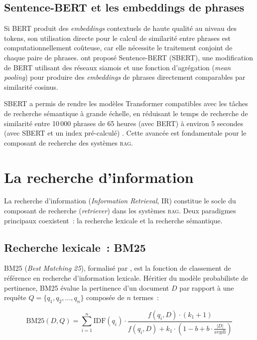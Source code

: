 \documentclass[12pt,a4paper,oneside]{report}
\newcommand{\rag}{\textsc{rag}}
\begin{document}
\subsection{Sentence-BERT et les embeddings de phrases}

Si BERT produit des \textit{embeddings} contextuels de haute qualité au niveau des tokens, son utilisation directe pour le calcul de similarité entre phrases est computationnellement coûteuse, car elle nécessite le traitement conjoint de chaque paire de phrases. \citet{reimers2019} ont proposé Sentence-BERT (SBERT), une modification de BERT utilisant des réseaux siamois et une fonction d'agrégation (\textit{mean pooling}) pour produire des \textit{embeddings} de phrases directement comparables par similarité cosinus.

SBERT a permis de rendre les modèles Transformer compatibles avec les tâches de recherche sémantique à grande échelle, en réduisant le temps de recherche de similarité entre 10\,000 phrases de 65 heures (avec BERT) à environ 5 secondes (avec SBERT et un index pré-calculé) \citep{reimers2019}. Cette avancée est fondamentale pour le composant de recherche des systèmes \rag{}.

\section{La recherche d'information}
\label{sec:ri}

La recherche d'information (\textit{Information Retrieval}, IR) constitue le socle du composant de recherche (\textit{retriever}) dans les systèmes \rag{}. Deux paradigmes principaux coexistent~: la recherche lexicale et la recherche sémantique.

\subsection{Recherche lexicale~: BM25}

BM25 (\textit{Best Matching 25}), formalisé par \citet{robertson2009}, est la fonction de classement de référence en recherche d'information lexicale. Héritier du modèle probabiliste de pertinence, BM25 évalue la pertinence d'un document $D$ par rapport à une requête $Q = \{q_1, q_2, \ldots, q_n\}$ composée de $n$ termes~:

\begin{equation}
\text{BM25}(D, Q) = \sum_{i=1}^{n} \text{IDF}(q_i) \cdot \frac{f(q_i, D) \cdot (k_1 + 1)}{f(q_i, D) + k_1 \cdot \left(1 - b + b \cdot \frac{|D|}{\text{avgdl}}\right)}
\label{eq:bm25}
\end{equation}
\end{document}
